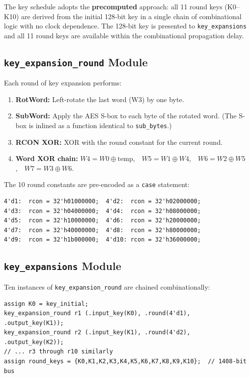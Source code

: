 \documentclass[12pt,a4paper]{article}
\begin{document}
The key schedule adopts the \textbf{precomputed} approach: all 11 round keys
(K0--K10) are derived from the initial 128-bit key in a single chain of
combinational logic with no clock dependence. The 128-bit key is presented
to \texttt{key\_expansions} and all 11 round keys are available within the
combinational propagation delay.

\subsection{\texttt{key\_expansion\_round} Module}

Each round of key expansion performs:

\begin{enumerate}[nosep]
  \item \textbf{RotWord:} Left-rotate the last word (W3) by one byte.
  \item \textbf{SubWord:} Apply the AES S-box to each byte of the rotated word.
        (The S-box is inlined as a function identical to \texttt{sub\_bytes}.)
  \item \textbf{RCON XOR:} XOR with the round constant for the current round.
  \item \textbf{Word XOR chain:} $W4 = W0 \oplus \text{temp}$,\ \ $W5 = W1 \oplus W4$,\ \ $W6 = W2 \oplus W5$,\ \ $W7 = W3 \oplus W6$.
\end{enumerate}

The 10 round constants are pre-encoded as a \texttt{case} statement:

\begin{lstlisting}[caption={RCON lookup table (rounds 1--10)}]
4'd1:  rcon = 32'h01000000;  4'd2:  rcon = 32'h02000000;
4'd3:  rcon = 32'h04000000;  4'd4:  rcon = 32'h08000000;
4'd5:  rcon = 32'h10000000;  4'd6:  rcon = 32'h20000000;
4'd7:  rcon = 32'h40000000;  4'd8:  rcon = 32'h80000000;
4'd9:  rcon = 32'h1b000000;  4'd10: rcon = 32'h36000000;
\end{lstlisting}

\subsection{\texttt{key\_expansions} Module}

Ten instances of \texttt{key\_expansion\_round} are chained combinationally:

\begin{lstlisting}[caption={Unrolled key expansion chain}]
assign K0 = key_initial;
key_expansion_round r1 (.input_key(K0), .round(4'd1),  .output_key(K1));
key_expansion_round r2 (.input_key(K1), .round(4'd2),  .output_key(K2));
// ... r3 through r10 similarly
assign round_keys = {K0,K1,K2,K3,K4,K5,K6,K7,K8,K9,K10};  // 1408-bit bus
\end{lstlisting}
\end{document}

